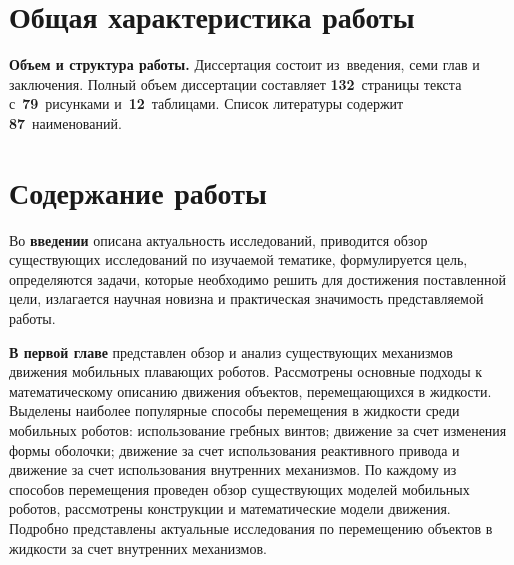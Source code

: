 \section*{Общая характеристика работы}

\newcommand{\actuality}{{\textbf{\actualityTXT}}}
\newcommand{\progress}{{\textbf{\progressTXT}}}
\newcommand{\aim}{{{\textbf\aimTXT}}}
\newcommand{\tasks}{{\textbf{\tasksTXT}}}
\newcommand{\novelty}{{\textbf{\noveltyTXT}}}
\newcommand{\influence}{{\textbf{\influenceTXT}}}
\newcommand{\methods}{{\textbf{\methodsTXT}}}
\newcommand{\defpositions}{{\textbf{\defpositionsTXT}}}
\newcommand{\reliability}{{\textbf{\reliabilityTXT}}}
\newcommand{\probation}{{\textbf{\probationTXT}}}
\newcommand{\contribution}{{\textbf{\contributionTXT}}}
\newcommand{\publications}{{\textbf{\publicationsTXT}}}




{\textbf{Объем и структура работы.}} Диссертация состоит из~введения,
семи глав и заключения. Полный объем диссертации составляет
\textbf{132}~страницы текста с~\textbf{79}~рисунками и~\textbf{12}~таблицами. Список
литературы содержит \textbf{87}~наименований.



\section*{Содержание работы}
Во {\textbf{введении}} описана актуальность исследований, приводится обзор существующих исследований по изучаемой тематике, формулируется цель, определяются задачи, которые необходимо решить для достижения поставленной цели, излагается научная новизна и практическая значимость представляемой работы.


{\textbf{В первой главе}} представлен обзор и анализ существующих механизмов движения мобильных плавающих роботов. Рассмотрены основные подходы к математическому описанию движения объектов, перемещающихся в жидкости. Выделены наиболее популярные способы перемещения в жидкости среди мобильных роботов: использование гребных винтов; движение за счет изменения формы оболочки; движение за счет использования реактивного привода и движение за счет использования внутренних механизмов. По каждому из способов перемещения проведен обзор существующих моделей мобильных роботов, рассмотрены конструкции и математические модели движения. Подробно представлены актуальные исследования по перемещению объектов в жидкости за счет внутренних механизмов. %

